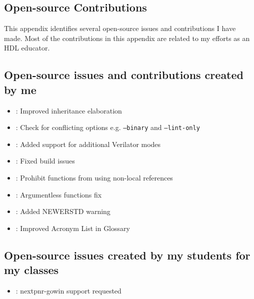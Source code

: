 
\begin{appendices}



\chapter{Open-source Contributions}
\label{appx:contributions}

This appendix identifies several open-source issues and contributions I have made. Most of the contributions in this appendix are related to my efforts as an HDL educator.

\section{Open-source issues and contributions created by me}

\begin{itemize}
    \item [\mergedicon] : Improved inheritance elaboration
    \item [\mergedicon] : Check for conflicting options e.g. \texttt{--binary} and \texttt{--lint-only}
    \item [\pullrequesticon] : Added support for additional Verilator modes
    \item [\mergedicon] : Fixed build issues
    \item [\mergedicon] : Prohibit functions from using non-local references
    \item [\mergedicon] : Argumentless functions fix
    \item [\mergedicon] : Added NEWERSTD warning
    \item [\mergedicon] : Improved Acronym List in Glossary
\end{itemize}

\section{Open-source issues created by my students for my classes}

\begin{itemize}
    \item [\issueclosedicon] : nextpnr-gowin support requested
\end{itemize}




\end{appendices}
